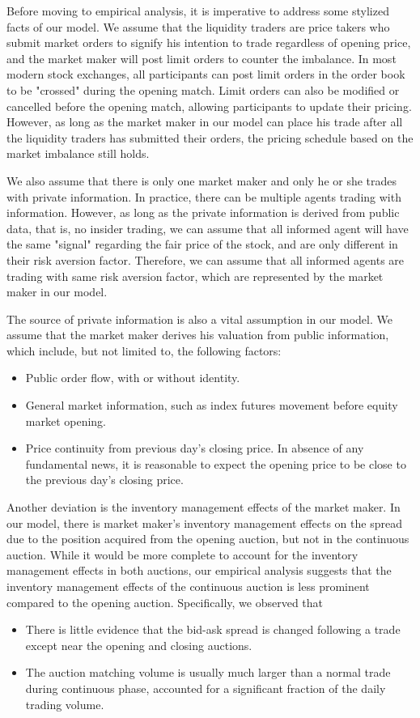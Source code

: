 \documentclass{article}
\begin{document}
Before moving to empirical analysis, it is imperative to address some stylized facts of our model. We assume that the liquidity traders are price takers who submit market orders to signify his intention to trade regardless of opening price, and the market maker will post limit orders to counter the imbalance. In most modern stock exchanges, all participants can post limit orders in the order book to be "crossed" during the opening match. Limit orders can also be modified or cancelled before the opening match, allowing participants to update their pricing. However, as long as the market maker in our model can place his trade after all the liquidity traders has submitted their orders, the pricing schedule based on the market imbalance still holds.

We also assume that there is only one market maker and only he or she trades with private information. In practice, there can be multiple agents trading with information. However, as long as the private information is derived from public data, that is, no insider trading, we can assume that all informed agent will have the same "signal" regarding the fair price of the stock, and are only different in their risk aversion factor. Therefore, we can assume that all informed agents are trading with same risk aversion factor, which are represented by the market maker in our model.

The source of private information is also a vital assumption in our model. We assume that the market maker derives his valuation from public information, which include, but not limited to, the following factors:
\begin{itemize}
  \item Public order flow, with or without identity.
  \item General market information, such as index futures movement before equity market opening.
  \item Price continuity from previous day's closing price. In absence of any fundamental news, it is reasonable to expect the opening price to be close to the previous day's closing price.
\end{itemize}

Another deviation is the inventory management effects of the market maker. In our model, there is market maker's inventory management effects on the spread due to the position acquired from the opening auction, but not in the continuous auction. While it would be more complete to account for the inventory management effects in both auctions, our empirical analysis suggests that the inventory management effects of the continuous auction is less prominent compared to the opening auction. Specifically, we observed that
\begin{itemize}
  \item There is little evidence that the bid-ask spread is changed following a trade except near the opening and closing auctions.
  \item The auction matching volume is usually much larger than a normal trade during continuous phase, accounted for a significant fraction of the daily trading volume.
\end{itemize}
\end{document}

